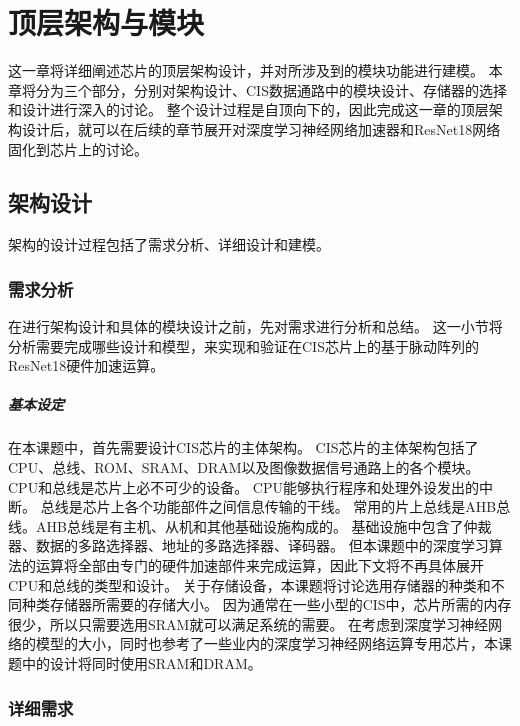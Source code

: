 
\chapter{顶层架构与模块}
这一章将详细阐述芯片的顶层架构设计，并对所涉及到的模块功能进行建模。
本章将分为三个部分，分别对架构设计、CIS数据通路中的模块设计、存储器的选择和设计进行深入的讨论。
整个设计过程是自顶向下的，因此完成这一章的顶层架构设计后，就可以在后续的章节展开对深度学习神经网络加速器和ResNet18网络固化到芯片上的讨论。


\section{架构设计}
架构的设计过程包括了需求分析、详细设计和建模。


\subsection{需求分析}
在进行架构设计和具体的模块设计之前，先对需求进行分析和总结。
这一小节将分析需要完成哪些设计和模型，来实现和验证在CIS芯片上的基于脉动阵列的ResNet18硬件加速运算。


\paragraph{基本设定}

在本课题中，首先需要设计CIS芯片的主体架构。
CIS芯片的主体架构包括了CPU、总线、ROM、SRAM、DRAM以及图像数据信号通路上的各个模块。
CPU和总线是芯片上必不可少的设备。
CPU能够执行程序和处理外设发出的中断。
总线是芯片上各个功能部件之间信息传输的干线。
常用的片上总线是AHB总线。AHB总线是有主机、从机和其他基础设施构成的。
基础设施中包含了仲裁器、数据的多路选择器、地址的多路选择器、译码器。
但本课题中的深度学习算法的运算将全部由专门的硬件加速部件来完成运算，因此下文将不再具体展开CPU和总线的类型和设计。
关于存储设备，本课题将讨论选用存储器的种类和不同种类存储器所需要的存储大小。
因为通常在一些小型的CIS中，芯片所需的内存很少，所以只需要选用SRAM就可以满足系统的需要。
在考虑到深度学习神经网络的模型的大小，同时也参考了一些业内的深度学习神经网络运算专用芯片，本课题中的设计将同时使用SRAM和DRAM。


\subsection{详细需求}

